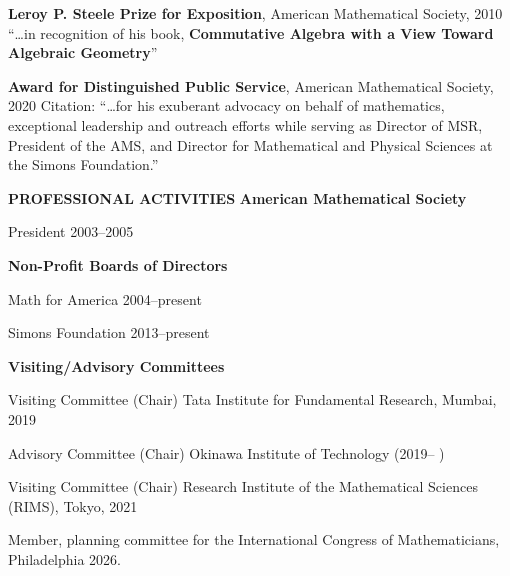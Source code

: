 \item{} {\bf Leroy P. Steele Prize for Exposition}, American Mathematical Society, 2010\hfill
``\dots in recognition of his book, {\bf Commutative Algebra with a View Toward Algebraic Geometry}''
\item{} {\bf Award for Distinguished Public Service}, American Mathematical Society, 2020 \hfill
Citation: ``\dots for his exuberant advocacy on behalf of mathematics, exceptional leadership and outreach efforts
while serving as Director of MSR, President of the AMS, and Director for Mathematical and Physical Sciences
at the Simons Foundation.''

\goodbreak

{\bf  PROFESSIONAL ACTIVITIES}
\smallbreak 
{\bf American Mathematical Society}
\item{} President 2003--2005
\smallbreak 

{\bf Non-Profit Boards of Directors}
\item{} Math for America 2004--present
\item{} Simons Foundation 2013--present
\smallbreak 

{\bf Visiting/Advisory Committees}
\item{}Visiting Committee (Chair)
  Tata Institute for Fundamental Research, Mumbai, 2019
\item{} Advisory Committee (Chair)
  Okinawa Institute of Technology (2019-- )
\item{} Visiting Committee (Chair)
     Research Institute of the Mathematical Sciences (RIMS), Tokyo, 2021
\item{} Member, planning committee for the International Congress of Mathematicians, Philadelphia 2026.

